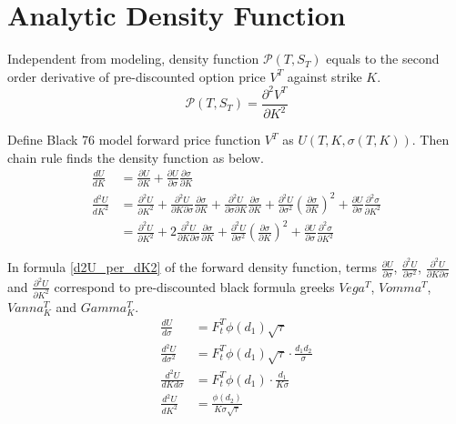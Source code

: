 \documentclass{article}
\begin{document}
\section{Analytic Density Function} \label{Analytic Density Function}

Independent from modeling, density function $ \mathcal{P}\left(T, S_T\right) $ equals to the second order derivative of pre-discounted option price $ V^T $ against strike $ K $.
\begin{equation}
    \mathcal{P}\left(T, S_T\right) = \frac{\partial^2 V^T}{\partial K^2}
\end{equation}

Define Black 76 model forward price function $ V^T $ as $ U\left(T, K, \sigma(T, K)\right) $.
Then chain rule finds the density function as below.
\begin{align}
    \frac{d U}{d K} &= \frac{\partial U}{\partial K} + \frac{\partial U}{\partial \sigma} \frac{\partial \sigma}{\partial K} \\
    \frac{d^2 U}{d K^2} &= \frac{\partial^2 U}{\partial K^2} + \frac{\partial^2 U}{\partial K \partial \sigma} \frac{\partial \sigma}{\partial K}  + \frac{\partial^2 U}{\partial \sigma \partial K} \frac{\partial \sigma}{\partial K} + \frac{\partial^2 U}{\partial \sigma^2} \left(\frac{\partial \sigma}{\partial K}\right)^2 + \frac{\partial U}{\partial \sigma} \frac{\partial^2 \sigma}{\partial K^2} \nonumber \\
    &= \frac{\partial^2 U}{\partial K^2} + 2 \frac{\partial^2 U}{\partial K \partial \sigma} \frac{\partial \sigma}{\partial K} + \frac{\partial^2 U}{\partial \sigma^2} \left(\frac{\partial \sigma}{\partial K}\right)^2 + \frac{\partial U}{\partial \sigma} \frac{\partial^2 \sigma}{\partial K^2} \label{d2U_per_dK2}
\end{align}

In formula \ref{d2U_per_dK2} of the forward density function, terms $ \frac{\partial U}{\partial \sigma} $, $ \frac{\partial^2 U}{\partial \sigma^2} $, $ \frac{\partial^2 U}{\partial K \partial \sigma} $ and $ \frac{\partial^2 U}{\partial K^2} $ correspond to pre-discounted black formula greeks $ Vega^T $, $ Vomma^T $, $ Vanna_{K}^T $ and $ Gamma_{K}^T $.
\begin{subequations}
    \begin{align}
        \frac{d U}{d \sigma} &= F_{t}^{T} \phi(d_1) \sqrt{\tau} \\
        \frac{d^2 U}{d \sigma^2} &= F_{t}^{T} \phi(d_1) \sqrt{\tau} \cdot \frac{d_1 d_2}{\sigma} \\
        \frac{d^2 U}{d K d \sigma} &= F_{t}^{T} \phi(d_1) \cdot \frac{d_1}{K \sigma} \\
        \frac{d^2 U}{d K^2} &= \frac{\phi(d_2)}{K \sigma \sqrt{\tau}}
    \end{align}
\end{subequations}
\end{document}
